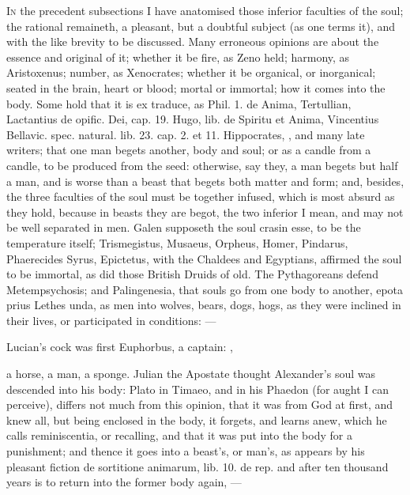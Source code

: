 {\lettrine{I}{n} the precedent subsections I have anatomised those inferior faculties
of the soul; the rational remaineth, a pleasant, but a doubtful subject
(as one terms it), and with the like brevity to be discussed. Many
erroneous opinions are about the essence and original of it; whether it
be fire, as Zeno held; harmony, as Aristoxenus; number, as Xenocrates;
whether it be organical, or inorganical; seated in the brain, heart or
blood; mortal or immortal; how it comes into the body. Some hold that
it is ex traduce, as Phil. 1. de Anima, Tertullian, Lactantius de
opific. Dei, cap. 19. Hugo, lib. de Spiritu et Anima, Vincentius
Bellavic. spec. natural. lib. 23. cap. 2. et 11. Hippocrates, \Avicenna{},
and many  late writers; that one man begets another, body and
soul; or as a candle from a candle, to be produced from the seed:
otherwise, say they, a man begets but half a man, and is worse than a
beast that begets both matter and form; and, besides, the three
faculties of the soul must be together infused, which is most absurd as
they hold, because in beasts they are begot, the two inferior I mean,
and may not be well separated in men.  Galen supposeth the soul
crasin esse, to be the temperature itself; \textlatin{Trismegistus}, Musaeus,
Orpheus, Homer, Pindarus, Phaerecides Syrus, Epictetus, with the
Chaldees and Egyptians, affirmed the soul to be immortal, as did those
British Druids of old. The Pythagoreans defend
Metempsychosis; and Palingenesia, that souls go from one body to
another, epota prius Lethes unda, as men into wolves, bears, dogs,
hogs, as they were inclined in their lives, or participated in
conditions:
---

Lucian's cock was first Euphorbus, a captain:
,

a horse, a man, a sponge. Julian the Apostate thought Alexander's
soul was descended into his body: Plato in Timaeo, and in his Phaedon (for aught I can perceive),
differs not much from this opinion, that it
was from God at first, and knew all, but being enclosed in the body, it
forgets, and learns anew, which he calls reminiscentia, or recalling,
and that it was put into the body for a punishment; and thence it goes
into a beast's, or man's, as appears by his pleasant fiction de
sortitione animarum, lib. 10. de rep. and after ten thousand
years is to return into the former body again,
---

}
